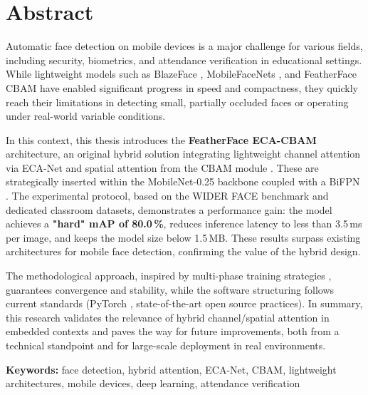 \chapter*{Abstract}

Automatic face detection on mobile devices is a major challenge for various fields, including security, biometrics, and attendance verification in educational settings. While lightweight models such as BlazeFace \cite{Zhang2019BlazeFace}, MobileFaceNets \cite{Chen2018MobileFaceNets}, and FeatherFace CBAM \cite{Kim2025FeatherFace} have enabled significant progress in speed and compactness, they quickly reach their limitations in detecting small, partially occluded faces or operating under real-world variable conditions.

In this context, this thesis introduces the \textbf{FeatherFace ECA-CBAM} architecture, an original hybrid solution integrating lightweight channel attention via ECA-Net \cite{Wang2020ECANet} and spatial attention from the CBAM module \cite{Woo2018CBAM}. These are strategically inserted within the MobileNet-0.25 backbone coupled with a BiFPN \cite{Tan2020EfficientDet}. The experimental protocol, based on the WIDER FACE benchmark \cite{Yang2016WIDERFACE} and dedicated classroom datasets, demonstrates a performance gain: the model achieves a \textbf{"hard" mAP of 80.0\,\%}, reduces inference latency to less than 3.5\,ms per image, and keeps the model size below 1.5\,MB. These results surpass existing architectures for mobile face detection, confirming the value of the hybrid design.

The methodological approach, inspired by multi-phase training strategies \cite{Wang2024ECACBAM}, guarantees convergence and stability, while the software structuring follows current standards (PyTorch \cite{Paszke2019PyTorch}, state-of-the-art open source practices). In summary, this research validates the relevance of hybrid channel/spatial attention in embedded contexts and paves the way for future improvements, both from a technical standpoint and for large-scale deployment in real environments.

\vspace{1cm}

\noindent\textbf{Keywords:} face detection, hybrid attention, ECA-Net, CBAM, lightweight architectures, mobile devices, deep learning, attendance verification
